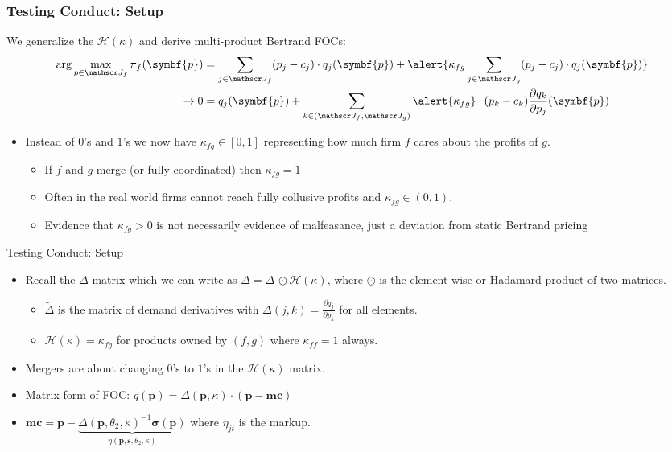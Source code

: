 \documentclass[aspectratio=169,10pt]{beamer}
\begin{document}
\begin{frame}
\frametitle{Testing Conduct: Setup}
\small
We generalize the $\mathcal{H}(\kappa)$ and derive multi-product Bertrand FOCs:
\begin{align*}
\arg \max_{p \in \calJ_f} \pi_f (\symbf{p}) &= \sum_{j \in \calJ_f} (p_j - c_j) \cdot q_j(\symbf{p}) +  \alert{\kappa_{fg} \sum_{j \in \calJ_g} (p_j - c_j) \cdot q_j(\symbf{p})} \\
\rightarrow 0&= q_j(\symbf{p}) + \sum_{k \in (\calJ_f,\calJ_g)} \alert{\kappa_{fg}}\cdot (p_k - c_k) \frac{\partial q_{k}}{\partial p_j}(\symbf{p}) 
\end{align*}
\begin{itemize}
\item Instead of $0$'s and $1$'s we now have $\kappa_{fg} \in [0,1]$ representing how much firm $f$ cares about the profits of $g$.
\begin{itemize}
\item If $f$ and $g$ merge (or fully coordinated) then $\kappa_{fg} =1$
\item Often in the real world firms cannot reach fully collusive profits and $\kappa_{fg} \in (0,1)$.
\item Evidence that $\kappa_{fg} > 0$ is not necessarily evidence of malfeasance, just a deviation from \alert{static Bertrand pricing}
\end{itemize}
\end{itemize}
\end{frame}


\begin{frame}{Testing Conduct: Setup}
\begin{itemize}
\item Recall the $\Delta$ matrix which we can write as $\Delta=\tilde{\Delta}\, \odot \mathcal{H}(\kappa)$, where $\odot$ is the element-wise or Hadamard product of two matrices. 
\begin{itemize}
\item $\tilde{\Delta}$ is the matrix of demand derivatives with $\Delta{(j,k)} = \frac{\partial q_j}{\partial p_k}$ for all elements.
\item $\mathcal{H}(\kappa)=\kappa_{fg}$ for products owned by $(f,g)$ where $\kappa_{ff}=1$ always.
\end{itemize}
\item Mergers are about changing $0$'s to $1$'s in the $\mathcal{H}(\kappa)$ matrix.
\item Matrix form of FOC: $q(\symbf{p}) = \Delta(\symbf{p},\kappa)\cdot(\symbf{p}-\symbf{mc})$
\item $\symbf{mc} =  \symbf{p} - \underbrace{\Delta(\symbf{p}, \theta_2, \kappa)^{-1} \symbf{\sigma}(\symbf{p})}_{\eta(\symbf{p},\symbf{s},\theta_2,\kappa)}$
where $\eta_{jt}$ is the markup.
\end{itemize}
\end{frame}
\end{document}
